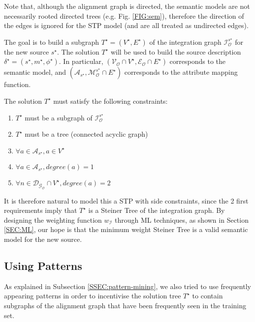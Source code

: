 \documentclass[letterpaper]{article} %
\begin{document}
Note that, although the alignment graph is directed, the semantic models are 
not necessarily rooted directed trees (e.g. Fig. \ref{FIG:sem}), therefore the 
direction of the edges is ignored for the STP model (and are all treated as 
undirected edges). 

The goal is to build a subgraph $T^\star= (V^\star, E^\star)$ 
of the integration graph 
$\mathcal{I}_\mathcal{O}^{s^\star}$ for the new source $s^\star$. The solution 
$T^\star$ will 
be used to build the source description $\delta^\star = (s^\star, m^\star, 
\phi^\star)$. 
In particular, $(\mathcal{V_O} \cap V^\star,\mathcal{E_O} \cap E^\star)$ 
corresponds to the semantic model, and 
$(\mathcal{A}_{s^\star},\mathcal{M}_\mathcal{O}^{s^\star} \cap E^\star)$ 
corresponds to 
the attribute mapping function.

The solution $T^\star$ must satisfy the following constraints:
\begin{enumerate}
	\item $T^\star$ must be a subgraph of $\mathcal{I}_\mathcal{O}^{s^\star}$
	\item $T^\star$ must be a tree (connected acyclic graph)
	\item $\forall a \in \mathcal{A}_{s^\star}, a\in V^\star$
	\item $\forall a \in \mathcal{A}_{s^\star}, degree(a) = 1$
	\item $\forall n \in \mathcal{D_{G_O}} \cap V^\star, 
	degree(a) = 2$
\end{enumerate}

It is therefore natural to model this a STP with side constraints, since the 2 
first requirements imply that $T^\star$ is a Steiner Tree of the integration 
graph. By designing the weighting function $w_\mathcal{I}$ through ML 
techniques, as shown in Section \ref{SEC:ML}, 
our hope is that the minimum weight Steiner Tree is a valid semantic model for 
the new source.


\subsection{Using Patterns}

As explained in Subsection \ref{SSEC:pattern-mining}, we also tried to use 
frequently appearing patterns in order to incentivise the solution tree 
$T^\star$ to contain subgraphs of the alignment graph that have been frequently 
seen in the training set.
\end{document}
